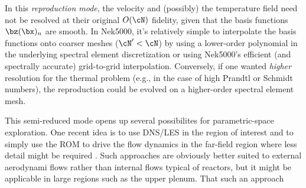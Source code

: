 

In this {\em reproduction mode}, the velocity and (possibly) the temperature
field need not be resolved at their original $O(\cN)$ fidelity, given that the
basis functions $\bz(\bx)_n$ are smooth.  In Nek5000, it's relatively simple
to interpolate the basis functions onto coarser meshes ($\cN' < \cN$) by
using a lower-order polynomial in the underlying spectral element discretization
or using Nek5000's efficient (and spectrally accurate) grid-to-grid interpolation.
Conversely, if one wanted {\em higher} resolution for the thermal problem (e.g.,
in the case of high Prandtl or Schmidt numbers), the reproduction could be
evolved on a higher-order spectral element mesh.

This semi-reduced mode opens up several possibilites for parametric-space
exploration.  One recent idea is to use DNS/LES in the region of interest and
to simply use the ROM to drive the flow dynamics in the far-field region where
less detail might be required \cite{bergmann18}.  Such approaches are obviously
better suited to external aerodynami flows rather than internal flows typical
of reactors, but it might be applicable in large regions such as the upper
plenum.  That such an approach












